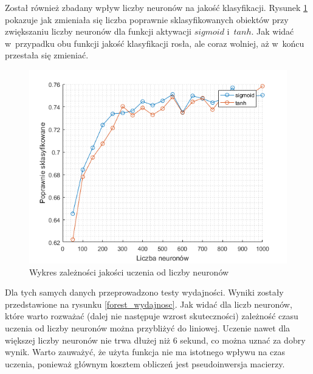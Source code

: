 \documentclass{article}
\begin{document}
Został również zbadany wpływ liczby neuronów na jakość klasyfikacji.
Rysunek \ref{forest_liczba_neuronow} pokazuje jak zmieniała się liczba poprawnie sklasyfikowanych obiektów przy zwiększaniu liczby neuronów dla funkcji aktywacji $sigmoid$ i~$tanh$.
Jak widać w~przypadku obu funkcji jakość klasyfikacji rosła, ale coraz wolniej, aż w~końcu przestała się zmieniać.
\begin{figure}[H]
\centering
\includegraphics[width=\textwidth]{forest_liczba_neuronow.png}
\caption{Wykres zależności jakości uczenia od liczby neuronów}
\label{forest_liczba_neuronow}
\end{figure}

Dla tych samych danych przeprowadzono testy wydajności.
Wyniki zostały przedstawione na rysunku \ref{forest_wydajnosc}.
Jak widać dla liczb neuronów, które warto rozważać (dalej nie następuje wzrost skuteczności) zależność czasu uczenia od liczby neuronów można przybliżyć do liniowej.
Uczenie nawet dla większej liczby neuronów nie trwa dłużej niż 6 sekund, co można uznać za dobry wynik.
Warto zauważyć, że użyta funkcja nie ma istotnego wpływu na czas uczenia, ponieważ głównym kosztem obliczeń jest pseudoinwersja macierzy.
\end{document}
